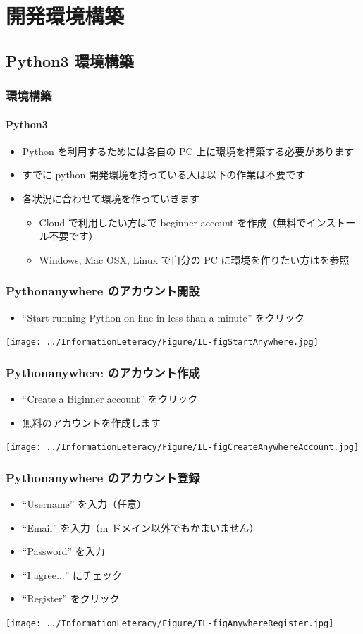 \section{開発環境構築}
\subsection{Python3 環境構築}
\begin{frame}[shrink]
\frametitle{環境構築}
\framesubtitle{Python3}
  \begin{itemize}
\item Python を利用するためには各自の PC 上に環境を構築する必要があります
\item すでに python 開発環境を持っている人は以下の作業は不要です
\item 各状況に合わせて環境を作っていきます
    \begin{itemize}
\item Cloud で利用したい方は\href{https://www.pythonanywhere.com/}{}で beginner account を作成（無料でインストール不要です）
\item Windows, Mac OSX, Linux で自分の PC に環境を作りたい方は\href{https://www.python.jp/install/install.html}{}を参照
    \end{itemize}
  \end{itemize}
\end{frame}
\begin{frame}
\frametitle{Pythonanywhere のアカウント開設}
  \begin{itemize}
\item ``Start running Python on line in less than a minute'' をクリック
  \end{itemize}
\texttt{[image: ../InformationLeteracy/Figure/IL-figStartAnywhere.jpg]}
\end{frame}
\begin{frame}
\frametitle{Pythonanywhere のアカウント作成}
  \begin{itemize}
\item ``Create a Biginner account'' をクリック
\item 無料のアカウントを作成します
  \end{itemize}
\texttt{[image: ../InformationLeteracy/Figure/IL-figCreateAnywhereAccount.jpg]}
\end{frame}
\begin{frame}
\frametitle{Pythonanywhere のアカウント登録}
  \begin{itemize}
\item ``Username'' を入力（任意）
\item ``Email'' を入力（m ドメイン以外でもかまいません）
\item ``Password'' を入力
\item ``I agree$\ldots$'' にチェック
\item ``Register'' をクリック
  \end{itemize}
\texttt{[image: ../InformationLeteracy/Figure/IL-figAnywhereRegister.jpg]}
\end{frame}
